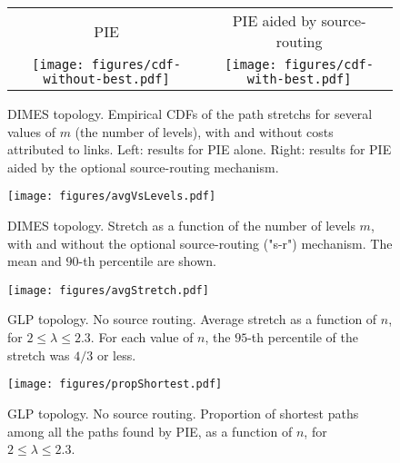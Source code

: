 \documentclass[conference]{IEEEtran}
\begin{document}
\begin{figure*}
\centering
\begin{tabular}{c c}
PIE & PIE aided by source-routing\\[0.1em]
\texttt{[image: figures/cdf-without-best.pdf]} &
\texttt{[image: figures/cdf-with-best.pdf]}\\
\end{tabular}
\vspace{-1em}
\caption{DIMES topology. Empirical CDFs of the path stretchs for several values of $m$ (the number of levels), with and without costs attributed to links. Left: results for PIE alone. Right: results for PIE aided by the optional source-routing mechanism.}
\vspace{-1.2em}
\label{fig:perfDimes1}
\end{figure*}

\begin{figure}
\centering
\vspace{0.03in}
\texttt{[image: figures/avgVsLevels.pdf]}\vspace{-0.7em}
\caption{DIMES topology. Stretch as a function of the number of levels $m$, with and without the optional source-routing ("s-r") mechanism. The mean and $90$-th percentile are shown.}
\vspace{-1.2em}
\label{fig:perfDimes2}
\end{figure}

\begin{figure}
\centering
\vspace{0.03in}
\texttt{[image: figures/avgStretch.pdf]}\vspace{-0.7em}
\caption{GLP topology. No source routing. Average stretch as a function of $n$, for $2 \leq \lambda \leq 2.3$. For each value of $n$, the $95$-th percentile of the stretch was $4/3$ or less.}
\vspace{-1.2em}
\label{fig:perfGLP1}
\end{figure}

\begin{figure}
\centering
\texttt{[image: figures/propShortest.pdf]}\vspace{-0.7em}
\caption{GLP topology. No source routing. Proportion of shortest paths among all the paths found by PIE, as a function of $n$, for $2 \leq \lambda \leq 2.3$.}
\vspace{-1.2em}
\label{fig:perfGLP2}
\end{figure}
\end{document}
